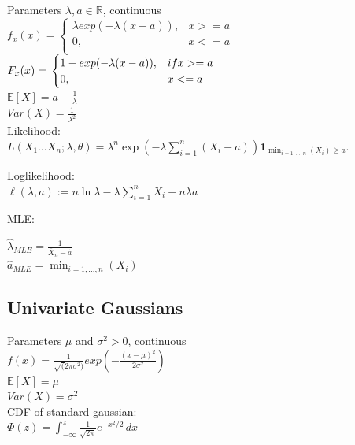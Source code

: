 Parameters $\lambda, a \in \mathbb{R}$, continuous\\
$ f_x(x)=
	\begin{cases}
		 \lambda exp(-\lambda(x - a )),&{x >= a}\\
		0,&{x <= a}\\
	\end{cases}
$\\

$ F_x(x)=\\
	\begin{cases}
		 1-exp(-\lambda(x-a)),&{if x >= a}\\
		0,&{x <= a}\\
	\end{cases}
$\\

$\mathbb{E}[X]=a + \frac{1}{\lambda}$\\

$Var(X)=\frac{1}{\lambda^2}$\\

Likelihood:\\

$L(X_1\dots X_n;\lambda,\theta)= \lambda ^ n \exp \left( -\lambda \sum _{i = 1}^ n (X_ i - a) \right) \mathbf{1}_{\min _{i = 1, \ldots , n}(X_ i) \geq a}.$

Loglikelihood:\\

$\ell (\lambda , a) := n \ln \lambda - \lambda \sum _{i = 1}^ n X_ i + n \lambda a$

MLE:

$\hat{\lambda }_{MLE} = \frac{1}{\overline{X}_ n - \hat{a}}$\\

$\hat{a}_{MLE} = \min _{i =1, \ldots , n}(X_ i)$

\subsection*{Univariate Gaussians}
Parameters $\mu$ and $\sigma^2 >0$, continuous\\
$f(x)= \frac{1}{\sqrt(2 \pi \sigma^2)} exp(-\frac{(x-\mu)^2}{2\sigma^2})$ \\
$\mathbb{E}[X]=\mu$ \\
$Var(X)=\sigma^2$\\

CDF of standard gaussian:\\

$\Phi (z) = \int _{-\infty }^ z \frac{1}{\sqrt{2 \pi }} e^{-x^2/2} \,  dx$

